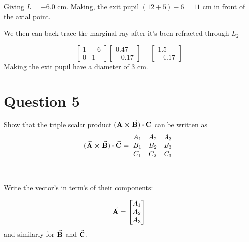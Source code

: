 \documentclass[a4paper]{article}
\begin{document}
Giving $L=-6.0$ cm. Making, the exit pupil $(12 + 5) - 6 = 11$ cm in front of the axial point.

We then can back trace the marginal ray after it's been refracted through $L_2$

$$
\begin{bmatrix}
    1 & -6\\
    0 & 1
\end{bmatrix}
\begin{bmatrix}
    0.47\\
    -0.17 
\end{bmatrix}
=
\begin{bmatrix}
    1.5\\
    -0.17
\end{bmatrix}
$$
Making the exit pupil have a diameter of $3$ cm.



\section*{Question 5}
Show that the triple scalar product $(\va{A} \cross \va{B}) \vdot \va{C}$ can be written as
$$ (\va{A} \cross \va{B}) \vdot \va{C} = 
    \begin{vmatrix}
    A_1 & A_2 & A_3 \\
    B_1 & B_2 & B_3 \\
    C_1 & C_2 & C_3 
    \end{vmatrix}  $$ \\\\

Write the vector's in term's of their components:

$$ \va{A} = \begin{bmatrix}
    A_1 \\
    A_2 \\
    A_3 \\
\end{bmatrix} $$
and similarly for $\va{B}$ and $\va{C}$.
\end{document}
